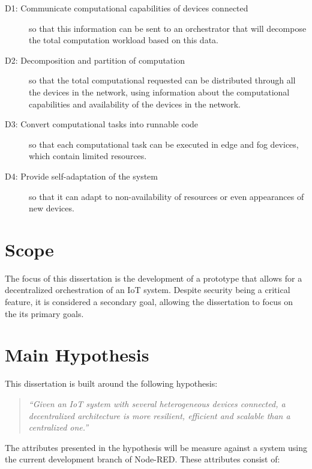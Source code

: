 \begin{description}
    \item [D1: Communicate computational capabilities of devices connected] so that this information can be sent to an orchestrator that will decompose the total computation workload based on this data.
    \item [D2: Decomposition and partition of computation] so that the total computational requested can be distributed through all the devices in the network, using information about the computational capabilities and availability of the devices in the network.
    \item [D3: Convert computational tasks into runnable code] so that each computational task can be executed in edge and fog devices, which contain limited resources.
    \item [D4: Provide self-adaptation of the system] so that it can adapt to non-availability of resources or even appearances of new devices.
\end{description}

\section{Scope}\label{sec:scope}

The focus of this dissertation is the development of a prototype that allows for a decentralized orchestration of an IoT system. Despite security being a critical feature, it is considered a secondary goal, allowing the dissertation to focus on the its primary goals.


\section{Main Hypothesis}\label{sec:main_hypothesis}

This dissertation is built around the following hypothesis:

\begin{quote}
    \emph{``Given an IoT system with several heterogeneous devices connected, a decentralized architecture is more resilient, efficient and scalable than a centralized one.''}
\end{quote}

The attributes presented in the hypothesis will be measure against a system using the current development branch of Node-RED. These attributes consist of:

